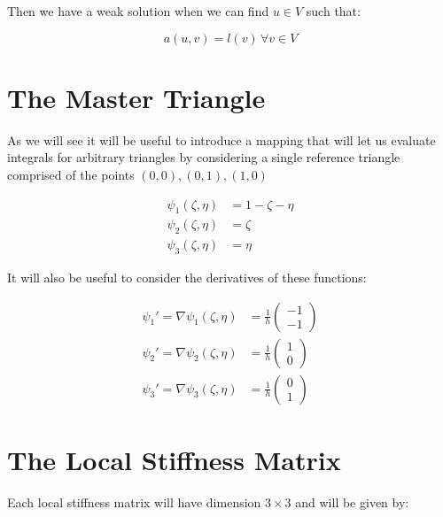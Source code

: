 Then we have a weak solution when we can find $u \in V$ such that:

\begin{equation}\label{eq:weak_formulation}
    a(u,v) = l(v)\, \forall v \in V
\end{equation}

\section{The Master Triangle}

As we will see it will be useful to introduce a mapping that will let us
evaluate integrals for arbitrary triangles by considering a single reference
triangle comprised of the points $(0,0), (0,1), (1,0)$


\begin{align}\label{eq:master_basis_functions}
    \psi_1(\zeta, \eta) &= 1 - \zeta - \eta \\
    \psi_2(\zeta, \eta) &= \zeta \\
    \psi_3(\zeta, \eta) &= \eta
\end{align}

It will also be useful to consider the derivatives of these functions:

\begin{align}\label{eq:master_basis_functions_derivative}
    \psi_1' = \nabla\psi_1(\zeta, \eta) &=
        \frac{1}{h}\left(\begin{array}{c}-1 \\ -1\end{array}\right) \\
    \psi_2' = \nabla\psi_2(\zeta, \eta) &=
        \frac{1}{h}\left(\begin{array}{c}1 \\ 0\end{array}\right) \\
    \psi_3' = \nabla\psi_3(\zeta, \eta) &=
        \frac{1}{h}\left(\begin{array}{c}0 \\ 1\end{array}\right)
\end{align}

\section{The Local Stiffness Matrix}

Each local stiffness matrix will have dimension $3 \times 3$ and will be given
by:

